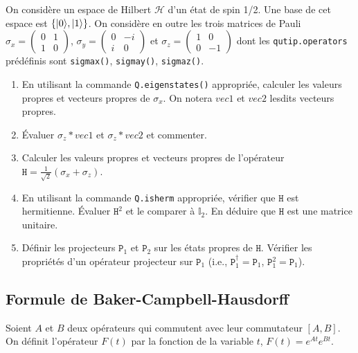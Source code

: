 \begin{itemize}
On considère un espace de Hilbert $\mathcal{H}$ d'un état de spin 1/2. Une base
de cet espace est $\{\vert0\rangle,\vert1\rangle\}$. On considère en outre les trois matrices
de Pauli $\sigma_x = \begin{pmatrix}0 & 1 \\ 1 & 0 \end{pmatrix}$, $\sigma_y =
\begin{pmatrix}0 & -i \\ i & 0 \end{pmatrix}$ et
$\sigma_z = \begin{pmatrix}1 & 0 \\ 0 & -1 \end{pmatrix}$ dont les 
\texttt{qutip.operators} prédéfinis sont \texttt{sigmax()}, \texttt{sigmay()}, 
\texttt{sigmaz()}.

\begin{enumerate}
\item En utilisant la commande \texttt{Q.eigenstates()} appropriée, calculer les 
valeurs propres et vecteurs propres de $\sigma_x$. On notera $vec1$ et $vec2$ 
lesdits vecteurs propres.

\item Évaluer $\sigma_z*vec1$ et $\sigma_z*vec2$ et commenter.

\item Calculer les valeurs propres et vecteurs propres de l'opérateur
$\mathtt{H} = \frac{1}{\sqrt{2}} (\sigma_x+\sigma_z)$.

\item En utilisant  la commande \texttt{Q.isherm} appropriée, vérifier que 
$\mathtt{H}$ est hermitienne. Évaluer $\mathtt{H}^2$ et le comparer à 
$\mathbb{I}_2$. En déduire que $\mathtt{H}$ est une matrice unitaire.

\item Définir les projecteurs $\mathtt{P}_1$ et $\mathtt{P}_2$ sur les états
propres de $\mathtt{H}$. Vérifier les propriétés d'un opérateur projecteur sur
$\mathtt{P}_1$ (i.e., $\mathtt{P}_1^{\dag}=\mathtt{P}_1$,
$\mathtt{P}_1^2=\mathtt{P}_1$).
\end{enumerate}

\subsection{Formule de Baker-Campbell-Hausdorff}

\label{sec:BCH1} Soient $A$ et $B$ deux opérateurs qui commutent avec leur
commutateur $[A,B]$. On définit l'opérateur $F(t)$ par la fonction de la
variable $t$, $F(t)=e^{At}e^{Bt}$.


\end{itemize}
